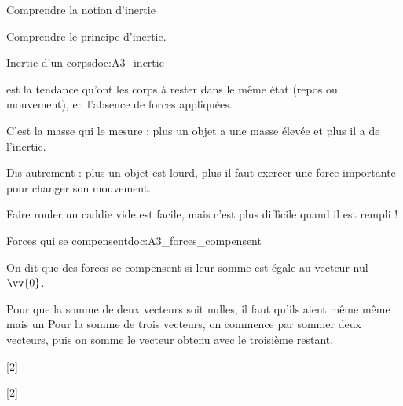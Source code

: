 \teteSndMouv


\vspace*{-32pt}


\begin{objectifs}
  \item Comprendre la notion d'inertie
  \item Comprendre le principe d'inertie.
\end{objectifs}


\begin{doc}{Inertie d'un corps}{doc:A3_inertie}
  \begin{importants}
     est la tendance qu'ont les corps à rester dans le même état (repos ou mouvement), en l'absence de forces appliquées.
  \end{importants}
    
  \fleche C'est la masse qui le mesure : plus un objet a une masse élevée et plus il a de l'inertie.
  
  \fleche Dis autrement : plus un objet est lourd, plus il faut exercer une force importante pour changer son mouvement.
  
  \exemple Faire rouler un caddie vide est facile, mais c'est plus difficile quand il est rempli !
\end{doc}


\begin{doc}{Forces qui se compensent}{doc:A3_forces_compensent}
  \begin{importants} 
    On dit que des forces se compensent si leur somme est égale au vecteur nul $\vv{0}$.
  \end{importants}
  Pour que la somme de deux vecteurs soit nulles, il faut qu'ils aient même  même  mais un 
  Pour la somme de trois vecteurs, on commence par sommer deux vecteurs, puis on somme le vecteur obtenu avec le troisième restant.
  
  \centering
\end{doc}

[2]

[2]



